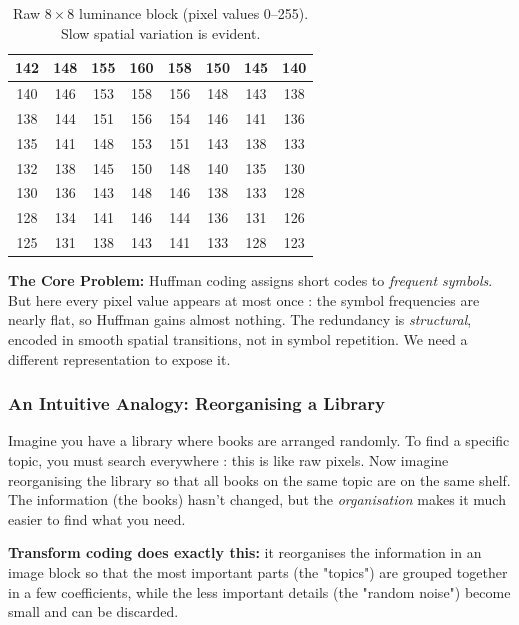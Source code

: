 \begin{table}[H]
\centering
\caption{Raw $8\times8$ luminance block (pixel values 0–255). Slow spatial variation is evident.}
\label{tab:rawblock}
\setlength{\tabcolsep}{5pt}
\begin{tabular}{|c|c|c|c|c|c|c|c|}
\hline
\rowcolor{LightBlue!20}
142 & 148 & 155 & 160 & 158 & 150 & 145 & 140 \\
\hline
140 & 146 & 153 & 158 & 156 & 148 & 143 & 138 \\
\hline
\rowcolor{LightGray!10}
138 & 144 & 151 & 156 & 154 & 146 & 141 & 136 \\
\hline
135 & 141 & 148 & 153 & 151 & 143 & 138 & 133 \\
\hline
\rowcolor{LightGray!10}
132 & 138 & 145 & 150 & 148 & 140 & 135 & 130 \\
\hline
130 & 136 & 143 & 148 & 146 & 138 & 133 & 128 \\
\hline
\rowcolor{LightGray!10}
128 & 134 & 141 & 146 & 144 & 136 & 131 & 126 \\
\hline
125 & 131 & 138 & 143 & 141 & 133 & 128 & 123 \\
\hline
\end{tabular}
\end{table}

\begin{importantbox}
\textbf{The Core Problem:} Huffman coding assigns short codes to \emph{frequent symbols}. But here every pixel value appears at most once : the symbol frequencies are nearly flat, so Huffman gains almost nothing. The redundancy is \emph{structural}, encoded in smooth spatial transitions, not in symbol repetition. We need a different representation to expose it.
\end{importantbox}

\subsubsection{An Intuitive Analogy: Reorganising a Library}

Imagine you have a library where books are arranged randomly. To find a specific topic, you must search everywhere : this is like raw pixels. Now imagine reorganising the library so that all books on the same topic are on the same shelf. The information (the books) hasn't changed, but the \emph{organisation} makes it much easier to find what you need.

\textbf{Transform coding does exactly this:} it reorganises the information in an image block so that the most important parts (the "topics") are grouped together in a few coefficients, while the less important details (the "random noise") become small and can be discarded.


